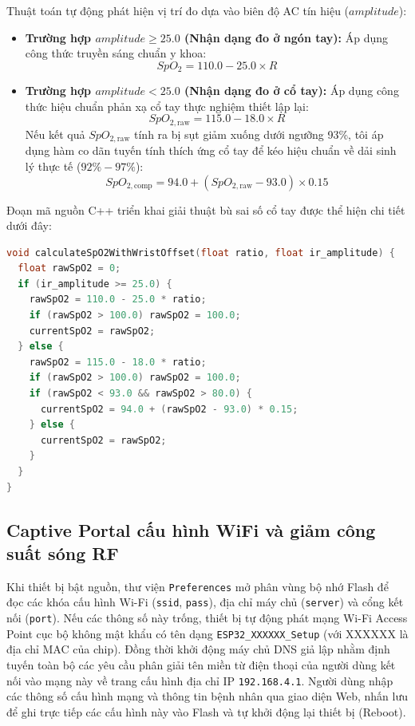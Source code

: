 Thuật toán tự động phát hiện vị trí đo dựa vào biên độ AC tín hiệu ($amplitude$):
\begin{itemize}
    \item \textbf{Trường hợp $amplitude \ge 25.0$ (Nhận dạng đo ở ngón tay):} Áp dụng công thức truyền sáng chuẩn y khoa:
    \begin{equation}
        SpO_2 = 110.0 - 25.0 \times R
    \end{equation}
    \item \textbf{Trường hợp $amplitude < 25.0$ (Nhận dạng đo ở cổ tay):}
    Áp dụng công thức hiệu chuẩn phản xạ cổ tay thực nghiệm thiết lập lại:
    \begin{equation}
        SpO_{2,\text{raw}} = 115.0 - 18.0 \times R
    \end{equation}
    Nếu kết quả $SpO_{2,\text{raw}}$ tính ra bị sụt giảm xuống dưới ngưỡng 93\%, tôi áp dụng hàm co dãn tuyến tính thích ứng cổ tay để kéo hiệu chuẩn về dải sinh lý thực tế ($92\% - 97\%$):
    \begin{equation}
        SpO_{2,\text{comp}} = 94.0 + (SpO_{2,\text{raw}} - 93.0) \times 0.15
    \end{equation}
\end{itemize}

Đoạn mã nguồn C++ triển khai giải thuật bù sai số cổ tay được thể hiện chi tiết dưới đây:
\begin{lstlisting}[language=C++]
void calculateSpO2WithWristOffset(float ratio, float ir_amplitude) {
  float rawSpO2 = 0;
  if (ir_amplitude >= 25.0) {
    rawSpO2 = 110.0 - 25.0 * ratio;
    if (rawSpO2 > 100.0) rawSpO2 = 100.0;
    currentSpO2 = rawSpO2;
  } else {
    rawSpO2 = 115.0 - 18.0 * ratio;
    if (rawSpO2 > 100.0) rawSpO2 = 100.0;
    if (rawSpO2 < 93.0 && rawSpO2 > 80.0) {
      currentSpO2 = 94.0 + (rawSpO2 - 93.0) * 0.15;
    } else {
      currentSpO2 = rawSpO2;
    }
  }
}
\end{lstlisting}

\subsection{Captive Portal cấu hình WiFi và giảm công suất sóng RF}
Khi thiết bị bật nguồn, thư viện \texttt{Preferences} mở phân vùng bộ nhớ Flash để đọc các khóa cấu hình Wi-Fi (\texttt{ssid}, \texttt{pass}), địa chỉ máy chủ (\texttt{server}) và cổng kết nối (\texttt{port}). Nếu các thông số này trống, thiết bị tự động phát mạng Wi-Fi Access Point cục bộ không mật khẩu có tên dạng \texttt{ESP32\_XXXXXX\_Setup} (với XXXXXX là địa chỉ MAC của chip). Đồng thời khởi động máy chủ DNS giả lập nhằm định tuyến toàn bộ các yêu cầu phân giải tên miền từ điện thoại của người dùng kết nối vào mạng này về trang cấu hình địa chỉ IP \texttt{192.168.4.1}. Người dùng nhập các thông số cấu hình mạng và thông tin bệnh nhân qua giao diện Web, nhấn lưu để ghi trực tiếp các cấu hình này vào Flash và tự khởi động lại thiết bị (Reboot).

